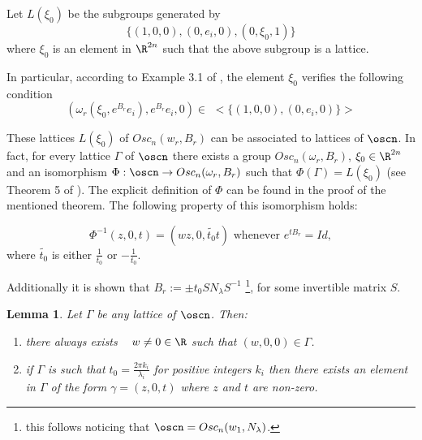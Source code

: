 \documentclass[11pt]{amsart}
\theoremstyle{plain}
\newtheorem{lem}[thm]{Lemma}
\theoremstyle{definition}
\theoremstyle{remark}
\begin{document}
	Let $L(\xi_0)$ be the subgroups generated by $$\{ (1,0,0),(0,e_i,0),(0,\xi_0, 1) \}$$ where $\xi_0$ is an element in $\R^{2n}$ such that the above subgroup is a lattice. 
	
In particular, according to Example 3.1 of \cite{MF}, the element $\xi_0$ verifies the following condition 
	\begin{equation}\label{xi-condition}
		(\omega_r(\xi_0, e^{B_r}e_i), e^{B_r} e_i, 0) \in \,\, <\{ (1,0,0),(0,e_i,0) \}>
	\end{equation}
	
	
	These lattices $L(\xi_0)$ of $Osc_n(w_r, B_r)$ can be associated to lattices of $\oscn$. In fact, for every lattice $\Gamma$ of $\oscn$ there exists a group $Osc_n(\omega_r, B_r)$, $\xi_0 \in \R^{2n}$ and an isomorphism $\Phi: \oscn \rightarrow Osc_n(\omega_r, B_r)$ such that $\Phi(\Gamma) = L(\xi_0)$ (see Theorem 5 of \cite{MF}). 	
	The explicit definition of $\Phi$ can be found in the proof of the mentioned theorem. The following property of this isomorphism holds:
	
	\begin{equation} \label{condition-exp}
		\Phi^{-1}(z,0,t) = (w z, 0, \widetilde{t_0} t ) \mbox{ whenever } e^{t B_r} = Id,
		\end{equation}
    where $\widetilde{t_0}$ is either $\frac{1}{t_0}$ or $-\frac{1}{t_0}$.

	Additionally it is shown that $B_r := \pm t_0 S N_{\lambda} S^{-1}$ \footnote{this follows noticing that $\oscn = Osc_n(w_{1}, N_{\lambda})$.}, for some invertible matrix $S$. 
	
	\begin{lem}\cite{MF}\label{oscilador-elementos}  %
		Let $\Gamma$ be any lattice of $\oscn$. Then:
		\begin{enumerate}
			\item there always exists \,\,\, $w \neq 0 \in \R$ such that $(w,0,0) \in \Gamma$.
			\item if $\Gamma$ is such that $t_0 = \frac{2 \pi k_i}{\lambda_i}$ for positive integers $k_i$ then there exists an element in $\Gamma$ of the form $\gamma = (z, 0, t)$ where $z$ and $t$ are non-zero.
		\end{enumerate}
	\end{lem} 
	
\end{document}
